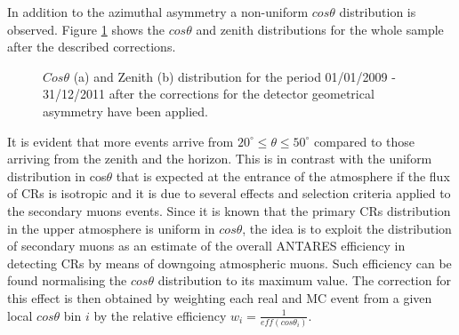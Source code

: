 \documentclass[a4paper]{jpconf}
\begin{document}
In addition to the azimuthal asymmetry a non-uniform $cos\theta$ distribution is observed. Figure \ref {fig:cz2} shows the $cos\theta$ and zenith distributions for the whole sample after the described corrections.
\begin{figure}[!h]
\centering
{} \quad
{}
\caption{$Cos\theta$ (a) and Zenith (b) distribution for the period 01/01/2009 - 31/12/2011 after the corrections for the detector geometrical asymmetry have been applied.}
\label{fig:cz2}
\end{figure}
It is evident that more events arrive from $ 20^{\circ}\le \theta \le 50^{\circ}$ compared to those arriving from the zenith and the horizon. This is in contrast with the uniform distribution in cos$\theta$ that is expected at the entrance of the atmosphere if the flux of CRs is isotropic and it is due to several effects and selection criteria applied to the secondary muons events. 
Since it is known that the primary CRs distribution in the upper atmosphere is uniform in $cos\theta$, the idea is to exploit the distribution of secondary muons as an estimate of the overall ANTARES efficiency in detecting CRs by means of downgoing atmospheric muons. Such efficiency can be found normalising the $cos\theta$ distribution to its maximum value.
The correction for this effect is then obtained by weighting each real and MC event from a given local $cos\theta$ bin $i$ by the relative efficiency $w_i = \frac{1}{eff(cos\theta _i)}$.
\end{document}
